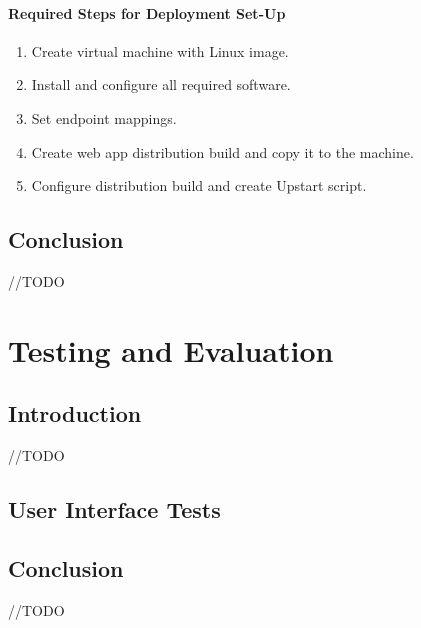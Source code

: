 \documentclass[12pt,twoside,a4paper]{report}
\begin{document}
\subsubsection{Required Steps for Deployment Set-Up}

\begin{enumerate}\itemsep1pt \parskip0pt 
\item Create virtual machine with Linux image.
\item Install and configure all required software.
\item Set endpoint mappings.
\item Create web app distribution build and copy it to the machine.
\item Configure distribution build and create Upstart script.
\end{enumerate}

\section{Conclusion}\label{4.7}
//TODO









\chapter{Testing and Evaluation}\label{5}

\section{Introduction}\label{5.1}
//TODO

\section{User Interface Tests}\label{5.2}

\section{Conclusion}\label{5.10}
//TODO
\end{document}
